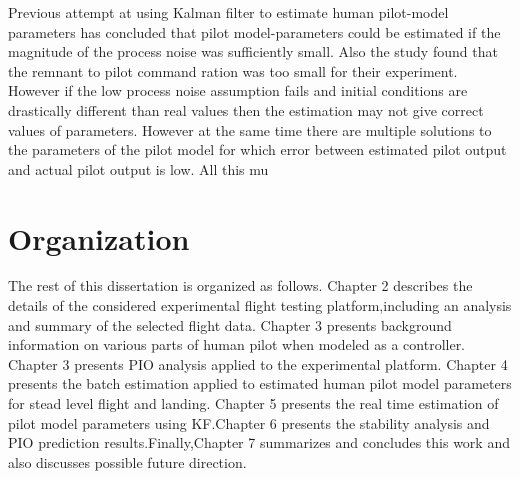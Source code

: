  Previous attempt at using Kalman filter\cite{schiess1975kalman} to estimate human pilot-model parameters has concluded that pilot model-parameters could be estimated if the magnitude of the process noise was sufficiently small. Also the study found that the remnant to pilot command ration was too small for their experiment. However if the low process noise assumption fails and initial conditions are drastically different than real values then the estimation may not give correct values of parameters. However at the same time there are multiple solutions to the parameters of the pilot model for which error between estimated pilot output and actual pilot output is low. All this mu

\section{Organization}
\doublespacing
\par The rest of this dissertation is organized as follows. Chapter 2 describes the details of the considered experimental flight testing platform,including an analysis and summary of the selected flight data. Chapter 3 presents background information on various parts of human pilot when modeled as a controller. Chapter 3 presents PIO analysis applied to the experimental platform. Chapter 4 presents the batch estimation applied to estimated human pilot model parameters for stead level flight and landing. Chapter 5 presents the real time estimation of pilot model parameters using KF.Chapter 6 presents the stability analysis and PIO prediction results.Finally,Chapter 7 summarizes and concludes this work and also discusses possible future direction.

